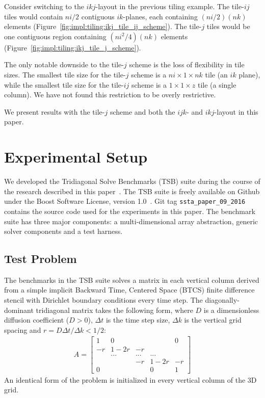 \documentclass{sig-alternate}
\begin{document}
Consider switching to the \(ikj\)-layout in the previous tiling example.
The tile-\(ij\) tiles would contain \(ni/2\) contiguous \(ik\)-planes, each
  containing \((ni/2)(nk)\) elements
  (Figure~\ref{fig:impl:tiling:ikj_tile_ij_scheme}).
The tile-\(j\) tiles would be one contiguous region containing
  \((ni^2/4)(nk)\) elements
  (Figure~\ref{fig:impl:tiling:ikj_tile_j_scheme}).

The only notable downside to the tile-\(j\) scheme is the loss of
  flexibility in tile sizes.
The smallest tile size for the tile-\(j\) scheme is a \(ni \times 1 \times nk\)
  tile (an \(ik\) plane), while the smallest tile size for the
  tile-\(ij\) scheme is a \(1 \times 1 \times z\) tile (a single column).
We have not found this restriction to be overly restrictive.

We present results with the tile-\(j\) scheme and both the \(ijk\)- and
  \(ikj\)-layout in this paper.

\section{Experimental Setup}
\label{sec:setup}
We developed the Tridiagonal Solve Benchmarks (TSB) suite during the course of
  the research described in this paper~\cite{tsb_git}.
The TSB suite is freely available on Github under the Boost Software License,
  version 1.0~\cite{boost_license}.
Git tag \lstinline{ssta_paper_09_2016} contains the source code used for the
  experiments in this paper.
The benchmark suite has three major components: a multi-dimensional array
  abstraction, generic solver components and a test harness.

\subsection{Test Problem}
\label{sec:setup:test_problem}

The benchmarks in the TSB suite solves a matrix in each vertical column derived
  from a simple implicit Backward Time, Centered Space (BTCS) finite difference
  stencil with Dirichlet boundary conditions every time step.
The diagonally-dominant tridiagonal matrix takes the following form,
  where \(D\) is a dimensionless diffusion coefficient (\(D > 0\)), \(\Delta t\)
  is the time step size, \(\Delta k\) is the vertical grid spacing and
  \(r=D \Delta t / \Delta k < 1/2\):
\begin{align*}
A = 
\begin{bmatrix}
1   & 0      &     &        & 0  \\
-r  & 1 - 2r & -r  &        &    \\
    & ...    & ... & ...    &    \\
    &        & -r  & 1 - 2r & -r \\
0   &        &     & 0      & 1
\end{bmatrix}  
\end{align*}
An identical form of the problem is initialized in every vertical column of the
  3D grid.
\end{document}

